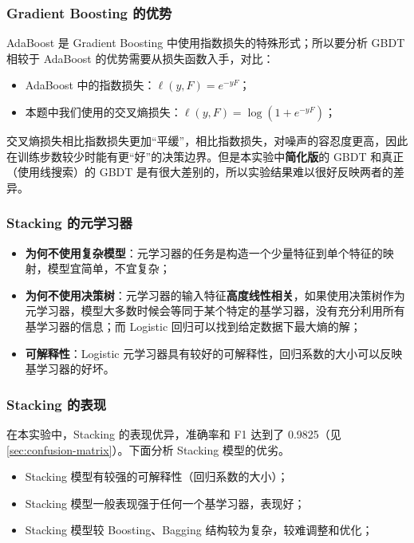\documentclass[oneside]{ctexbook}
\begin{document}
\subsubsection{Gradient Boosting 的优势}

AdaBoost 是 Gradient Boosting 中使用指数损失的特殊形式；所以要分析 GBDT 相较于 AdaBoost 的优势需要从损失函数入手，对比：

\begin{itemize}
    \item AdaBoost 中的指数损失：$\ell (y, F) = e^{-yF}$；
    \item 本题中我们使用的交叉熵损失：$\ell (y, F) = \log(1 + e^{-yF})$；
\end{itemize}

交叉熵损失相比指数损失更加“平缓”，相比指数损失，对噪声的容忍度更高，因此在训练步数较少时能有更“好”的决策边界。但是本实验中{\bf 简化版}的 GBDT 和真正（使用线搜索）的 GBDT 是有很大差别的，所以实验结果难以很好反映两者的差异。

\subsubsection{Stacking 的元学习器}

\begin{itemize}
    \item \textbf{为何不使用复杂模型}：元学习器的任务是构造一个少量特征到单个特征的映射，模型宜简单，不宜复杂；
    \item \textbf{为何不使用决策树}：元学习器的输入特征{\bf 高度线性相关}，如果使用决策树作为元学习器，模型大多数时候会等同于某个特定的基学习器，没有充分利用所有基学习器的信息；而 Logistic 回归可以找到给定数据下最大熵的解；
    \item \textbf{可解释性}：Logistic 元学习器具有较好的可解释性，回归系数的大小可以反映基学习器的好坏。
\end{itemize}

\subsubsection{Stacking 的表现}

在本实验中，Stacking 的表现优异，准确率和 F1 达到了 0.9825（见 \ref{sec:confusion-matrix}）。下面分析 Stacking 模型的优劣。

\begin{itemize}
    \item Stacking 模型有较强的可解释性（回归系数的大小）；
    \item Stacking 模型一般表现强于任何一个基学习器，表现好；
    \item Stacking 模型较 Boosting、Bagging 结构较为复杂，较难调整和优化；
\end{itemize}
\end{document}
